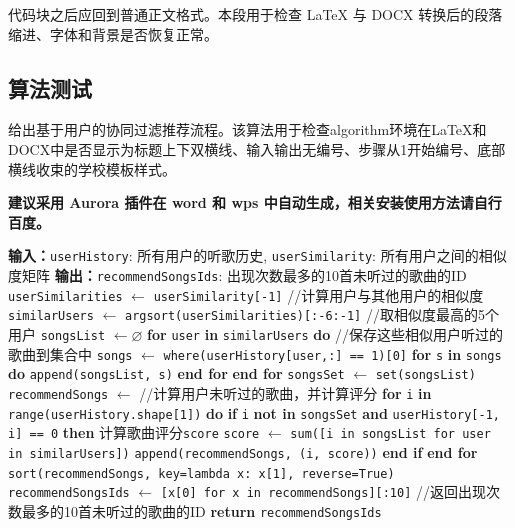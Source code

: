 代码块之后应回到普通正文格式。本段用于检查 LaTeX 与 DOCX 转换后的段落缩进、字体和背景是否恢复正常。

\subsection{算法测试}
给出基于用户的协同过滤推荐流程。该算法用于检查algorithm环境在LaTeX和DOCX中是否显示为标题上下双横线、输入输出无编号、步骤从1开始编号、底部横线收束的学校模板样式。

{\color{red}\bfseries 建议采用 Aurora 插件在 word 和 wps 中自动生成，相关安装使用方法请自行百度。}

\begin{algorithm}[ht]
    \caption{userBasedCollaborativeFiltering}\label{al:user_based_cf}
    \begin{algorithmic}[1]
        \Statex \textbf{输入：}\texttt{userHistory}: 所有用户的听歌历史, \texttt{userSimilarity}: 所有用户之间的相似度矩阵
        \Statex \textbf{输出：}\texttt{recommendSongsIds}: 出现次数最多的10首未听过的歌曲的ID
        \State \texttt{userSimilarities} $\leftarrow$ \texttt{userSimilarity[-1]} //计算用户与其他用户的相似度
        \State \texttt{similarUsers} $\leftarrow$ \texttt{argsort(userSimilarities)[:-6:-1]} //取相似度最高的5个用户
        \State \texttt{songsList} $\leftarrow \varnothing$
        \State \textbf{for} \texttt{user} \textbf{in} \texttt{similarUsers} \textbf{do} //保存这些相似用户听过的歌曲到集合中
        \State \hspace{1.5em}\texttt{songs} $\leftarrow$ \texttt{where(userHistory[user,:] == 1)[0]}
        \State \hspace{1.5em}\textbf{for} \texttt{s} \textbf{in} \texttt{songs} \textbf{do}
        \State \hspace{3em}\texttt{append(songsList, s)}
        \State \hspace{1.5em}\textbf{end for}
        \State \textbf{end for}
        \State \texttt{songsSet} $\leftarrow$ \texttt{set(songsList)}
        \State \texttt{recommendSongs} $\leftarrow$
        \State //计算用户未听过的歌曲，并计算评分
        \State \textbf{for} \texttt{i} \textbf{in} \texttt{range(userHistory.shape[1])} \textbf{do}
        \State \hspace{1.5em}\textbf{if} \texttt{i} \textbf{not in} \texttt{songsSet} \textbf{and} \texttt{userHistory[-1, i] == 0} \textbf{then}
        \State \hspace{3em}计算歌曲评分\texttt{score}
        \State \hspace{3em}\texttt{score} $\leftarrow$ \texttt{sum([i in songsList for user in similarUsers])}
        \State \hspace{3em}\texttt{append(recommendSongs, (i, score))}
        \State \hspace{1.5em}\textbf{end if}
        \State \textbf{end for}
        \State \texttt{sort(recommendSongs, key=lambda x: x[1], reverse=True)}
        \State \texttt{recommendSongsIds} $\leftarrow$ \texttt{[x[0] for x in recommendSongs][:10]}
        \State //返回出现次数最多的10首未听过的歌曲的ID
        \State \textbf{return} \texttt{recommendSongsIds}
    \end{algorithmic}
\end{algorithm}

